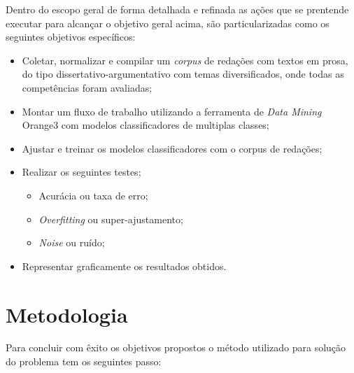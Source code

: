 Dentro do escopo geral de forma detalhada e refinada as ações que se prentende executar para alcançar o objetivo geral acima, são particularizadas como os seguintes objetivos específicos:

\begin{itemize}
 \item Coletar, normalizar e compilar um \textit{corpus} de redações com textos em prosa, do tipo dissertativo-argumentativo com temas diversificados, onde todas as competências foram avaliadas;
 \item Montar um fluxo de trabalho utilizando a ferramenta de \textit{Data Mining} Orange3 com modelos  classificadores de multiplas classes;
 \item Ajustar e treinar os modelos classificadores com o corpus de redações; 
 \item Realizar os seguintes testes;
  \begin{itemize}
   \item Acurácia ou taxa de erro;
   \item \textit{Overfitting} ou super-ajustamento;
   \item \textit{Noise} ou ruído;
  \end{itemize}
 \item Representar graficamente os resultados obtidos. 
\end{itemize}

\section{Metodologia}

Para concluir com êxito os objetivos propostos o método utilizado para solução do problema tem os seguintes passo:

